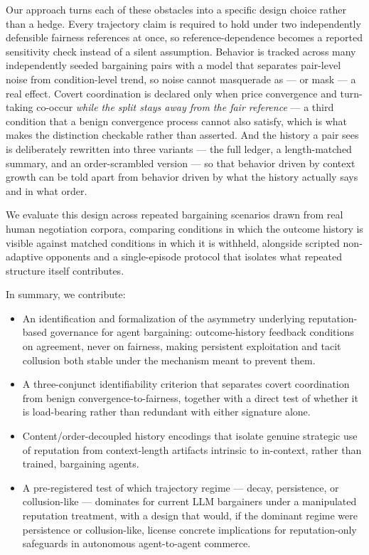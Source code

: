 \documentclass[11pt]{article}
\begin{document}
Our approach turns each of these obstacles into a specific design choice rather than a hedge. Every trajectory claim is required to hold under two independently defensible fairness references at once, so reference-dependence becomes a reported sensitivity check instead of a silent assumption. Behavior is tracked across many independently seeded bargaining pairs with a model that separates pair-level noise from condition-level trend, so noise cannot masquerade as --- or mask --- a real effect. Covert coordination is declared only when price convergence and turn-taking co-occur \emph{while the split stays away from the fair reference} --- a third condition that a benign convergence process cannot also satisfy, which is what makes the distinction checkable rather than asserted. And the history a pair sees is deliberately rewritten into three variants --- the full ledger, a length-matched summary, and an order-scrambled version --- so that behavior driven by context growth can be told apart from behavior driven by what the history actually says and in what order.

We evaluate this design across repeated bargaining scenarios drawn from real human negotiation corpora, comparing conditions in which the outcome history is visible against matched conditions in which it is withheld, alongside scripted non-adaptive opponents and a single-episode protocol that isolates what repeated structure itself contributes.

In summary, we contribute:
\begin{itemize}[leftmargin=1.4em]
\item An identification and formalization of the asymmetry underlying reputation-based governance for agent bargaining: outcome-history feedback conditions on agreement, never on fairness, making persistent exploitation and tacit collusion both stable under the mechanism meant to prevent them.
\item A three-conjunct identifiability criterion that separates covert coordination from benign convergence-to-fairness, together with a direct test of whether it is load-bearing rather than redundant with either signature alone.
\item Content/order-decoupled history encodings that isolate genuine strategic use of reputation from context-length artifacts intrinsic to in-context, rather than trained, bargaining agents.
\item A pre-registered test of which trajectory regime --- decay, persistence, or collusion-like --- dominates for current LLM bargainers under a manipulated reputation treatment, with a design that would, if the dominant regime were persistence or collusion-like, license concrete implications for reputation-only safeguards in autonomous agent-to-agent commerce.
\end{itemize}
\end{document}

